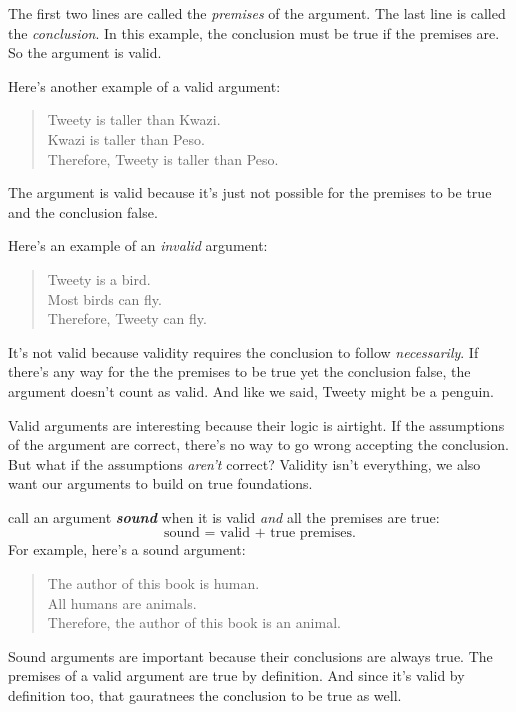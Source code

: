 \documentclass[justified]{tufte-book}
\newenvironment{argument}{\begin{quote}\normalsize}{\end{quote}}
\theoremstyle{definition}
\theoremstyle{definition}
\theoremstyle{definition}
\theoremstyle{remark}
\begin{document}
The first two lines are called the \emph{premises} of the argument. The
last line is called the \emph{conclusion}. In this example, the
conclusion must be true if the premises are. So the argument is valid.

Here's another example of a valid argument:

\begin{argument}
Tweety is taller than Kwazi.\\
Kwazi is taller than Peso.\\
Therefore, Tweety is taller than Peso.
\end{argument}

The argument is valid because it's just not possible for the premises to
be true and the conclusion false.

Here's an example of an \emph{invalid} argument:

\begin{argument}
Tweety is a bird.\\
Most birds can fly.\\
Therefore, Tweety can fly.
\end{argument}

It's not valid because validity requires the conclusion to follow
\emph{necessarily}. If there's any way for the the premises to be true
yet the conclusion false, the argument doesn't count as valid. And like
we said, Tweety might be a penguin.

Valid arguments are interesting because their logic is airtight. If the
assumptions of the argument are correct, there's no way to go wrong
accepting the conclusion. But what if the assumptions \emph{aren't}
correct? Validity isn't everything, we also want our arguments to build
on true foundations.

 call an argument \textbf{\emph{sound}} when it is valid
\emph{and} all the premises are true:
\[ \mbox{sound = valid + true premises}.\] For example, here's a sound
argument:

\begin{argument}
The author of this book is human.\\
All humans are animals.\\
Therefore, the author of this book is an animal.
\end{argument}

Sound arguments are important because their conclusions are always true.
The premises of a valid argument are true by definition. And since it's
valid by definition too, that gauratnees the conclusion to be true as
well.
\end{document}
